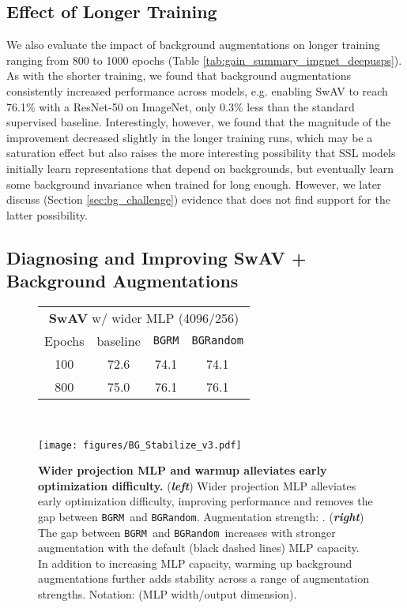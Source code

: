 \documentclass[twoside,11pt]{article}
\newcommand{\bgrm}{\texttt{BG\textunderscore RM}}
\newcommand{\bgrand}{\texttt{BG\textunderscore Random}}
\begin{document}
\subsection{Effect of Longer Training}

We also evaluate the impact of background augmentations on longer training ranging from 800 to 1000 epochs (Table \ref{tab:gain_summary_imgnet_deepusps}). As with the shorter training, we found that background augmentations consistently increased performance across models, e.g. enabling SwAV to reach 76.1\% with a ResNet-50 on ImageNet, only 0.3\% less than the standard supervised baseline. Interestingly, however, we found that the magnitude of the improvement decreased slightly in the longer training runs, which may be a saturation effect but also raises the more interesting possibility that SSL models initially learn representations that depend on backgrounds, but eventually learn some background invariance when trained for long enough. However, we later discuss (Section \ref{sec:bg_challenge}) evidence that does not find support for the latter possibility.

\subsection{Diagnosing and Improving SwAV + Background Augmentations}
\label{sec:diagnosis_swav}

\begin{figure}[t!]
\begin{minipage}{0.4\linewidth}
    \begin{tabular}{cccc}\toprule
        \multicolumn{4}{c}{\textbf{SwAV} w/ wider MLP (4096/256)} \\
        \rule{0pt}{3ex} Epochs & baseline & \bgrm & \bgrand\\ \midrule
        100  & 72.6 & 74.1 & 74.1 \\
        800  & 75.0 & 76.1 & 76.1 \\
        \bottomrule
    \end{tabular}
    \end{minipage}
    ~~~~~\begin{minipage}{0.5\linewidth}
    \centering
    \texttt{[image: figures/BG\_Stabilize\_v3.pdf]} 
    \end{minipage}
    \caption{
    \textbf{Wider projection MLP and warmup alleviates early optimization difficulty.} (\textit{\textbf{left}})
    Wider projection MLP alleviates early optimization difficulty, improving performance and removes the gap between \bgrm~and \bgrand. Augmentation strength: . 
    (\textit{\textbf{right}})
    The gap between \bgrm~and \bgrand~increases with stronger augmentation with the default (black dashed lines) MLP capacity. In addition to increasing MLP capacity, warming up background augmentations further adds  stability across a range of augmentation strengths. Notation: (MLP width/output dimension).
    }
    \label{tab:swav_wider_and_warmup}
\end{figure}
\end{document}
